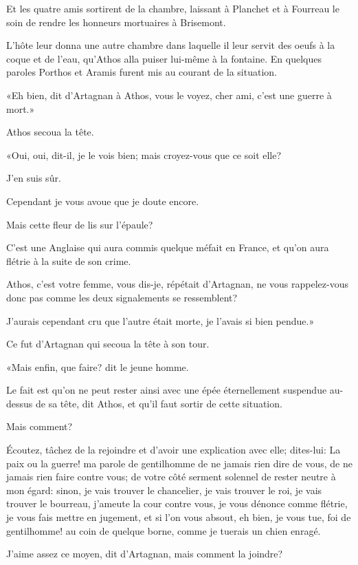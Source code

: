 Et les quatre amis sortirent de la chambre, laissant à Planchet et à Fourreau le soin de rendre les honneurs mortuaires à Brisemont. 

L'hôte leur donna une autre chambre dans laquelle il leur servit des oeufs à la coque et de l'eau, qu'Athos alla puiser lui-même à la fontaine. En quelques paroles Porthos et Aramis furent mis au courant de la situation. 

«Eh bien, dit d'Artagnan à Athos, vous le voyez, cher ami, c'est une guerre à mort.» 

Athos secoua la tête. 

«Oui, oui, dit-il, je le vois bien; mais croyez-vous que ce soit elle? 

\speak  J'en suis sûr. 

\speak  Cependant je vous avoue que je doute encore. 

\speak  Mais cette fleur de lis sur l'épaule? 

\speak  C'est une Anglaise qui aura commis quelque méfait en France, et qu'on aura flétrie à la suite de son crime. 

\speak  Athos, c'est votre femme, vous dis-je, répétait d'Artagnan, ne vous rappelez-vous donc pas comme les deux signalements se ressemblent? 

\speak  J'aurais cependant cru que l'autre était morte, je l'avais si bien pendue.» 

Ce fut d'Artagnan qui secoua la tête à son tour. 

«Mais enfin, que faire? dit le jeune homme. 

\speak  Le fait est qu'on ne peut rester ainsi avec une épée éternellement suspendue au-dessus de sa tête, dit Athos, et qu'il faut sortir de cette situation. 

\speak  Mais comment? 

\speak  Écoutez, tâchez de la rejoindre et d'avoir une explication avec elle; dites-lui: La paix ou la guerre! ma parole de gentilhomme de ne jamais rien dire de vous, de ne jamais rien faire contre vous; de votre côté serment solennel de rester neutre à mon égard: sinon, je vais trouver le chancelier, je vais trouver le roi, je vais trouver le bourreau, j'ameute la cour contre vous, je vous dénonce comme flétrie, je vous fais mettre en jugement, et si l'on vous absout, eh bien, je vous tue, foi de gentilhomme! au coin de quelque borne, comme je tuerais un chien enragé. 

\speak  J'aime assez ce moyen, dit d'Artagnan, mais comment la joindre? 

